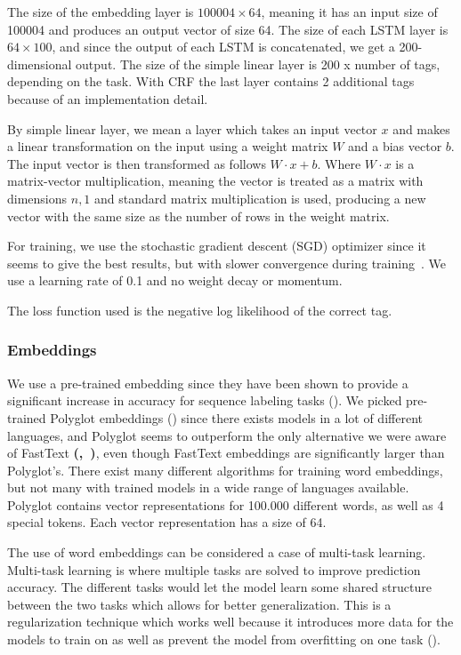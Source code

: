 The size of the embedding layer is $100004 \times 64$, meaning it has an input
size of 100004 and produces an output vector of size 64. The size of each LSTM
layer is $64 \times 100$, and since the output of each LSTM is concatenated, we
get a 200-dimensional output. The size of the simple linear layer is 200 x
number of tags, depending on the task. With CRF the last layer contains 2
additional tags because of an implementation detail.

By simple linear layer, we mean a layer which takes an input vector $x$ and
makes a linear transformation on the input using a weight matrix $W$ and a bias
vector $b$. The input vector is then transformed as follows $W \cdot x + b$.
Where $W \cdot x$ is a matrix-vector multiplication, meaning the vector is
treated as a matrix with dimensions $n,1$ and standard matrix multiplication is
used, producing a new vector with the same size as the number of rows in the
weight matrix.

For training, we use the stochastic gradient descent (SGD) optimizer since it
seems to give the best results, but with slower convergence during
training~\cite{yang2018design}. We use a learning rate of 0.1 and no weight
decay or momentum.

The loss function used is the negative log likelihood of the correct tag. 

\subsubsection{Embeddings}

We use a pre-trained embedding since they have been shown to provide a
significant increase in accuracy for sequence labeling tasks
(\cite{yang2018design}). We picked pre-trained Polyglot embeddings
(\cite{polyglot:2013:ACL-CoNLL}) since there exists models in a lot of different
languages, and Polyglot seems to outperform the only alternative we were aware
of FastText \textbf{(\cite{joulin2016bagoftricks},~\cite{plank2018distant})},
even though FastText embeddings are significantly larger than Polyglot's. There
exist many different algorithms for training word embeddings, but not many with
trained models in a wide range of languages available. Polyglot contains vector
representations for 100.000 different words, as well as 4 special tokens. Each
vector representation has a size of 64.

The use of word embeddings can be considered a case of multi-task learning.
Multi-task learning is where multiple tasks are solved to improve prediction
accuracy. The different tasks would let the model learn some shared structure
between the two tasks which allows for better generalization. This is a
regularization technique which works well because it introduces more data for
the models to train on as well as prevent the model from overfitting on one
task (\cite{goodfellow2016deep}).

